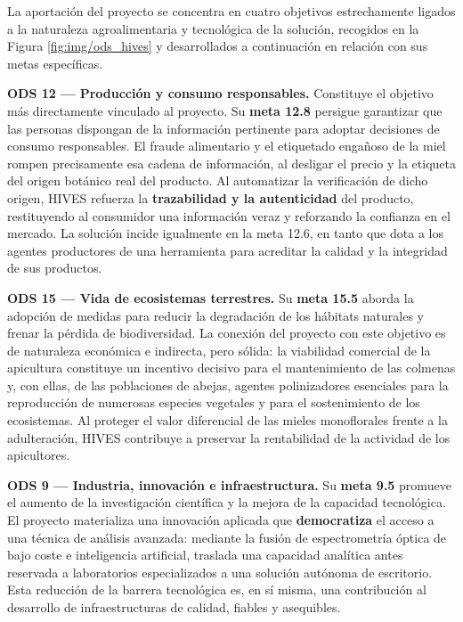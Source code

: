 La aportación  del proyecto se concentra en cuatro objetivos estrechamente
ligados a la naturaleza agroalimentaria y tecnológica de la solución, recogidos
en la Figura \ref{fig:img/ods_hives} y desarrollados a continuación en relación con sus metas
específicas.
 
\textbf{ODS 12 — Producción y consumo responsables.}
Constituye el objetivo más directamente vinculado al proyecto. Su
\textbf{meta 12.8} persigue garantizar que las personas dispongan de la
información pertinente para adoptar decisiones de consumo responsables. El fraude
alimentario y el etiquetado engañoso de la miel rompen precisamente esa cadena
de información, al desligar el precio y la etiqueta del origen botánico real del
producto. Al automatizar la verificación de dicho origen, HIVES refuerza la
\textbf{trazabilidad y la autenticidad} del producto, restituyendo al consumidor
una información veraz y reforzando la confianza en el mercado.
La solución incide igualmente en la meta 12.6, en tanto que dota a los agentes
productores de una herramienta para acreditar la calidad y la integridad de sus
productos.
 
\textbf{ODS 15 — Vida de ecosistemas terrestres.}
Su \textbf{meta 15.5} aborda la adopción de medidas para reducir la degradación
de los hábitats naturales y frenar la pérdida de biodiversidad. La conexión del
proyecto con este objetivo es de naturaleza económica e indirecta, pero sólida:
la viabilidad comercial de la apicultura constituye un incentivo decisivo para el
mantenimiento de las colmenas y, con ellas, de las poblaciones de abejas, agentes
polinizadores esenciales para la reproducción de numerosas especies vegetales y
para el sostenimiento de los ecosistemas. Al proteger el valor diferencial de las
mieles monoflorales frente a la adulteración, HIVES contribuye a preservar la
rentabilidad de la actividad de los apicultores.
 
\textbf{ODS 9 — Industria, innovación e infraestructura.}
Su \textbf{meta 9.5} promueve el aumento de la investigación científica y la
mejora de la capacidad tecnológica. El proyecto materializa una innovación
aplicada que \textbf{democratiza} el acceso a una técnica de análisis avanzada:
mediante la fusión de espectrometría óptica de bajo coste e inteligencia
artificial, traslada una capacidad analítica antes reservada a laboratorios
especializados a una solución autónoma de escritorio. Esta reducción de la
barrera tecnológica es, en sí misma, una contribución al desarrollo de
infraestructuras de calidad, fiables y asequibles.
 
